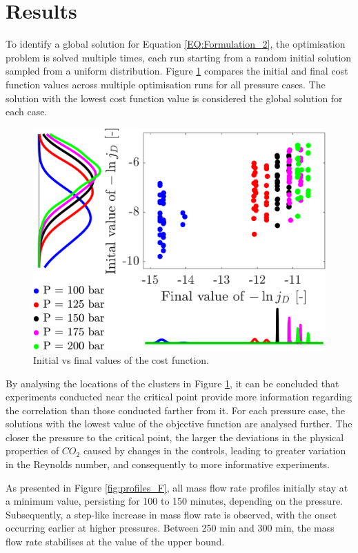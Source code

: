 \documentclass[a4paper,fleqn]{cas-dc}
\begin{document}
		\section{Results}
		To identify a global solution for Equation \ref{EQ:Formulation_2}, the optimisation problem is solved multiple times, each run starting from a random initial solution sampled from a uniform distribution. Figure \ref{fig:scatter} compares the initial and final cost function values across multiple optimisation runs for all pressure cases. The solution with the lowest cost function value is considered the global solution for each case.
		
		\begin{figure}[h!]
			\centering
			\includegraphics[width=0.90\columnwidth]{Figures/Results/scatter.png}	
			\caption{Initial vs final values of the cost function.}
			\label{fig:scatter}
		\end{figure}
		
		By analysing the locations of the clusters in Figure \ref{fig:scatter}, it can be concluded that experiments conducted near the critical point provide more information regarding the correlation than those conducted farther from it. For each pressure case, the solutions with the lowest value of the objective function are analysed further. The closer the pressure to the critical point, the larger the deviations in the physical properties of $CO_2$ caused by changes in the controls, leading to greater variation in the Reynolds number, and consequently to more informative experiments. 
		
		As presented in Figure \ref{fig:profiles_F}, all mass flow rate profiles initially stay at a minimum value, persisting for 100 to 150 minutes, depending on the pressure. Subsequently, a step-like increase in mass flow rate is observed, with the onset occurring earlier at higher pressures. Between 250 min and 300 min, the mass flow rate stabilises at the value of the upper bound.
		
\end{document}
